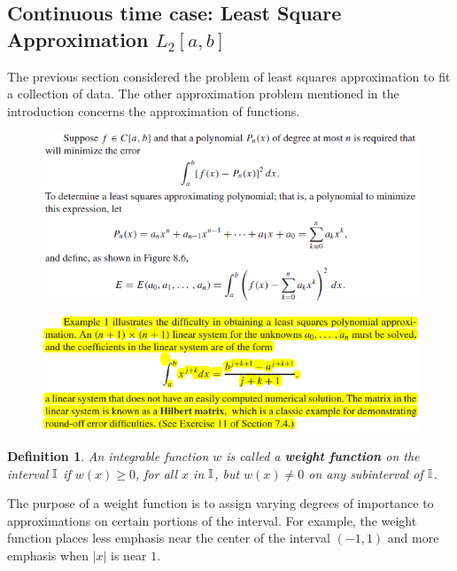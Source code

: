 \documentclass[12pt]{article}
\theoremstyle{theorem}
\newtheorem{defi}{Definition}
\begin{document}
\cleardoublepage 

\subsection{Continuous time case: Least Square Approximation $L_2[a,b]$}

The previous section considered the problem of least squares approximation to fit a collection of data. The other approximation problem mentioned in the introduction concerns the
approximation of functions.

\begin{figure}[h!]
	\centering
	\includegraphics[scale  = 0.8]{Figures/34}
\end{figure}

\begin{figure}[h!]
	\centering
	\includegraphics[scale = 0.8]{Figures/35}
	\label{fig:35}
\end{figure}

\begin{defi} An integrable function $w$ is called a \textbf{weight function} on the interval $\mathbb{I}$ if $w(x) \geq 0$, for all $x$ in $\mathbb{I}$, but $w(x) \not= 0$ on any subinterval of $\mathbb{I}$.
\end{defi}

The purpose of a weight function is to assign varying degrees of importance to approximations on certain portions of the interval. For example, the weight function	
places less emphasis near the center of the interval $(-1,1)$ and more emphasis when $|x|$ is near $1$.
\cleardoublepage 
\end{document}
